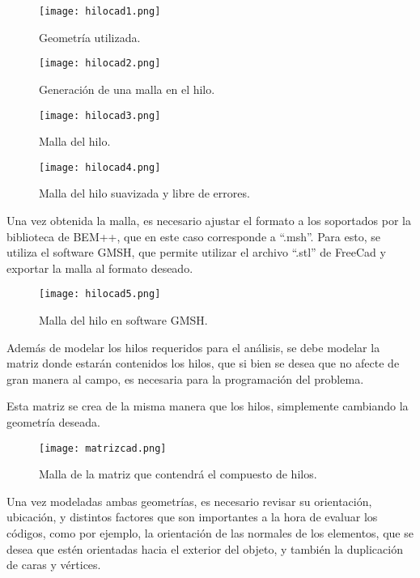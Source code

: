 \documentclass[12pt,letterpaper]{report}
\numberwithin{equation}{section}
\begin{document}
\begin{figure}[H]
	\centering\texttt{[image: hilocad1.png]}
	\caption{Geometría utilizada.}
\end{figure}

\begin{figure}[H]
	\centering\texttt{[image: hilocad2.png]}
	\caption{Generación de una malla en el hilo.}
\end{figure}

\begin{figure}[H]
	\centering\texttt{[image: hilocad3.png]}
	\caption{Malla del hilo.}
\end{figure}

\begin{figure}[H]
	\centering\texttt{[image: hilocad4.png]}
	\caption{Malla del hilo suavizada y libre de errores.}
\end{figure}

Una vez obtenida la malla, es necesario ajustar el formato a los soportados por la biblioteca de BEM++, que en este caso corresponde a ``.msh''. Para esto, se utiliza el software GMSH, que permite utilizar el archivo ``.stl'' de FreeCad y exportar la malla al formato deseado.

\begin{figure}[H]
	\centering\texttt{[image: hilocad5.png]}
	\caption{Malla del hilo en software GMSH.}
\end{figure}

Además de modelar los hilos requeridos para el análisis, se debe modelar la matriz donde estarán contenidos los hilos, que si bien se desea que no afecte de gran manera al campo, es necesaria para la programación del problema.

Esta matriz se crea de la misma manera que los hilos, simplemente cambiando la geometría deseada.

\begin{figure}[H]
	\centering\texttt{[image: matrizcad.png]}
	\caption{Malla de la matriz que contendrá el compuesto de hilos.}
\end{figure}

Una vez modeladas ambas geometrías, es necesario revisar su orientación, ubicación, y distintos factores que son importantes a la hora de evaluar los códigos, como por ejemplo, la orientación de las normales de los elementos, que se desea que estén orientadas hacia el exterior del objeto, y también la duplicación de caras y vértices.
\end{document}
